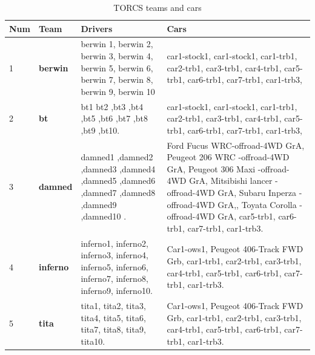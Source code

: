 \documentclass{llncs}
\begin{document}
\begin{table}[h!]
	
	\caption{TORCS teams and cars}
	\label{resultat30}
	\begin{tabular}{ |p{1cm}|p{2cm}|p{5cm}|p{6 cm}|}
		\hline
		{ \color{red}\textbf{Num} }&
		{ \color{red}\textbf{Team}}&  
		{ \color{red} \textbf{Drivers } } &
		{ \color{red} \textbf{Cars} }
		\\
		\hline
		1  & \textbf{berwin} & berwin 1,
		berwin 2,
		berwin 3,
		berwin 4,
		berwin 5,
		berwin 6,
		berwin 7,
		berwin 8,
		berwin 9,
		berwin 10
		& 
		car1-stock1,
		car1-stock1, car1-trb1,
		car2-trb1,
		car3-trb1,
		car4-trb1,
		car5-trb1,
		car6-trb1,
		car7-trb1,
		car1-trb3,
		\\
		\hline
		2 & \textbf{bt} & bt1
		bt2
		,bt3
		,bt4
		,bt5
		,bt6
		,bt7
		,bt8
		,bt9
		,bt10.
		
		&
		car1-stock1,
		car1-stock1, car1-trb1,
		car2-trb1,
		car3-trb1,
		car4-trb1,
		car5-trb1,
		car6-trb1,
		car7-trb1,
		car1-trb3, 
		\\
		\hline
		3 & \textbf{damned} & damned1
		,damned2
		,damned3
		,damned4
		,damned5
		,damned6
		,damned7
		,damned8
		,damned9
		,damned10
		.
		& 
		Ford Fucus WRC-offroad-4WD GrA,
		Peugeot 206 WRC -offroad-4WD GrA,
		Peugeot 306 Maxi -offroad-4WD GrA,
		Mitsibishi lancer -offroad-4WD GrA,
		Subaru Inperza -offroad-4WD GrA,,
		Toyata Corolla -offroad-4WD GrA,
		car5-trb1,
		car6-trb1,
		car7-trb1,
		car1-trb3.  
		\\
		\hline 
		4 & \textbf{inferno} & inferno1,
		inferno2,
		inferno3,
		inferno4,
		inferno5,
		inferno6,
		inferno7,
		inferno8,
		inferno9,
		inferno10.
		&
		Car1-ows1,
		Peugeot 406-Track FWD Grb,
		car1-trb1,
		car2-trb1,
		car3-trb1,
		car4-trb1,
		car5-trb1,
		car6-trb1,
		car7-trb1,
		car1-trb3.
		\\
		\hline 
		5 & \textbf{tita} & tita1,
		tita2,
		tita3,
		tita4,
		tita5,
		tita6,
		tita7,
		tita8,
		tita9,
		tita10.
		& 
		Car1-ows1,
		Peugeot 406-Track FWD Grb,
		car1-trb1,
		car2-trb1,
		car3-trb1,
		car4-trb1,
		car5-trb1,
		car6-trb1,
		car7-trb1,
		car1-trb3. 
		\\
		\hline 
		
	\end{tabular} 
	
\end{table}
\newpage
\end{document}
